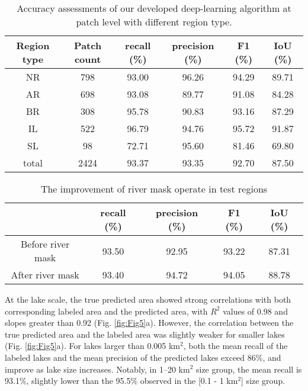 \documentclass[preprint,12pt,authoryear]{elsarticle}
\begin{document}
\begin{table}[t]
    \centering
    \caption{Accuracy assessments of our developed deep-learning algorithm at patch level with different region type.}\label{tabel1}
    \begin{tabular}{cccccc}
    \toprule
    Region type & Patch count & recall (\%)	& precision (\%) & F1 (\%) & IoU (\%) \\
    \midrule
    NR & 798 & 93.00 & 96.26 & 94.29 & 89.71 \\
    AR & 698 & 93.08 & 89.77 & 91.08 & 84.28 \\
    BR & 308 & 95.78 & 90.83 & 93.16 & 87.29 \\
    IL & 522 & 96.79 & 94.76 & 95.72 & 91.87 \\
    SL & 98 & 72.71 & 95.60 & 81.46 & 69.80 \\
    total & 2424 & 93.37 & 93.35 & 92.70 & 87.50 \\
    \bottomrule
    \end{tabular}
    
\end{table}

\begin{table}[t]
    \centering
    \caption{The improvement of river mask operate in test regions}\label{tabel2}
    \begin{tabular}{ccccc}
    \toprule
     & recall (\%)	& precision (\%) & F1 (\%) & IoU (\%) \\
    \midrule
    Before river mask & 93.50  & 92.95  & 93.22  & 87.31 \\
    After river mask & 93.40  & 94.72  & 94.05  & 88.78 \\
    \bottomrule
    \end{tabular}
\end{table}

At the lake scale, the true predicted area showed strong correlations with both corresponding labeled area and the predicted area, with $R^2$ values of 0.98 and slopes greater than 0.92 (Fig. \ref{fig:Fig5}a). However, the correlation between the true predicted area and the labeled area was slightly weaker for smaller lakes (Fig. \ref{fig:Fig5}a). For lakes larger than 0.005 km$^2$, both the mean recall of the labeled lakes and the mean precision of the predicted lakes exceed 86\%, and improve as lake size increases. Notably, in 1–20 km$^2$ size group, the mean recall is 93.1\%, slightly lower than the 95.5\% observed in the [0.1 - 1 km$^2$] size group.
\end{document}

